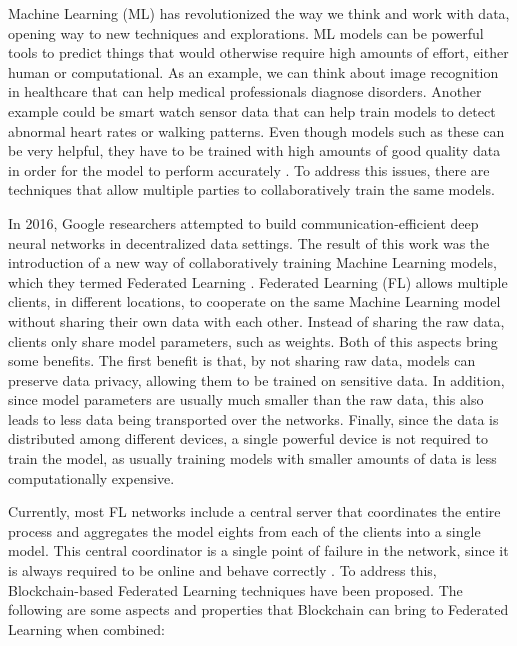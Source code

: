 Machine Learning (ML) has revolutionized the way we think and work with data, opening way to new techniques and explorations. ML models can be powerful tools to predict things that would otherwise require high amounts of effort, either human or computational. As an example, we can think about image recognition in healthcare that can help medical professionals diagnose disorders. Another example could be smart watch sensor data that can help train models to detect abnormal heart rates or walking patterns. Even though models such as these can be very helpful, they have to be trained with high amounts of good quality data in order for the model to perform accurately \cite{10.1145/3394486.3406477}. To address this issues, there are techniques that allow multiple parties to collaboratively train the same models.

In 2016, Google researchers attempted to build communication-efficient deep neural networks in decentralized data settings. The result of this work was the introduction of a new way of collaboratively training Machine Learning models, which they termed Federated Learning \cite{10.48550/arxiv.1602.05629}. Federated Learning (FL) allows multiple clients, in different locations, to cooperate on the same Machine Learning model without sharing their own data with each other. Instead of sharing the raw data, clients only share model parameters, such as weights. Both of this aspects bring some benefits. The first benefit is that, by not sharing raw data, models can preserve data privacy, allowing them to be trained on sensitive data. In addition, since model parameters are usually much smaller than the raw data, this also leads to less data being transported over the networks. Finally, since the data is distributed among different devices, a single powerful device is not required to train the model, as usually training models with smaller amounts of data is less computationally expensive.

Currently, most FL networks include a central server that coordinates the entire process and aggregates the model eights from each of the clients into a single model. This central coordinator is a single point of failure in the network, since it is always required to be online and behave correctly \cite{li_blockchain_2021, 10.48550/arxiv.2110.02182}. To address this, Blockchain-based Federated Learning techniques have been proposed. The following are some aspects and properties that Blockchain can bring to Federated Learning when combined:

